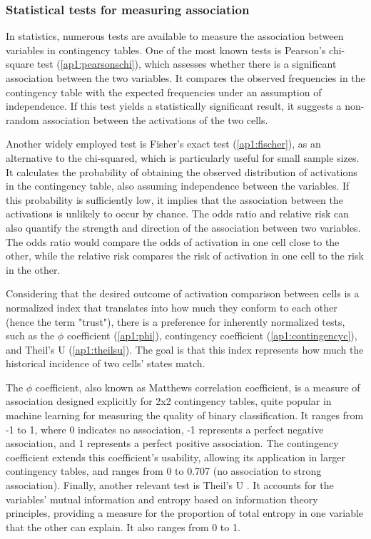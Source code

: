 \subsubsection{Statistical tests for measuring association}

In statistics, numerous tests are available to measure the association between variables in contingency tables. One of the most known tests is Pearson's chi-square test (\ref{ap1:pearsonschi}), which assesses whether there is a significant association between the two variables. It compares the observed frequencies in the contingency table with the expected frequencies under an assumption of independence. If this test yields a statistically significant result, it suggests a non-random association between the activations of the two cells.

Another widely employed test is Fisher's exact test (\ref{ap1:fischer}), as an alternative to the chi-squared, which is particularly useful for small sample sizes. It calculates the probability of obtaining the observed distribution of activations in the contingency table, also assuming independence between the variables. If this probability is sufficiently low, it implies that the association between the activations is unlikely to occur by chance. The odds ratio and relative risk can also quantify the strength and direction of the association between two variables. The odds ratio would compare the odds of activation in one cell close to the other, while the relative risk compares the risk of activation in one cell to the risk in the other.

Considering that the desired outcome of activation comparison between cells is a normalized index that translates into how much they conform to each other (hence the term "trust"), there is a preference for inherently normalized tests, such as the $\phi$ coefficient (\ref{ap1:phi}), contingency coefficient (\ref{ap1:contingencyc}), and Theil's U (\ref{ap1:theilsu}). The goal is that this index represents how much the historical incidence of two cells' states match.

The $\phi$ coefficient, also known as Matthews correlation coefficient, is a measure of association designed explicitly for 2x2 contingency tables, quite popular in machine learning for measuring the quality of binary classification. It ranges from -1 to 1, where 0 indicates no association, -1 represents a perfect negative association, and 1 represents a perfect positive association. The contingency coefficient extends this coefficient's usability, allowing its application in larger contingency tables, and ranges from 0 to 0.707 (no association to strong association).
Finally, another relevant test is Theil's U . It accounts for the variables' mutual information and entropy based on information theory principles, providing a measure for the proportion of total entropy in one variable that the other can explain. It also ranges from 0 to 1.

